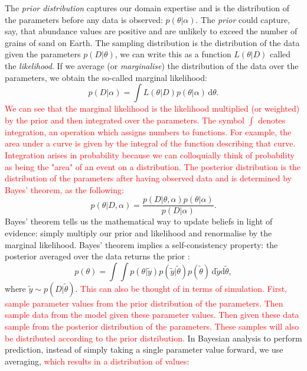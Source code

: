 \documentclass[12pt,english, journal=jpr, layout=twocolumn]{article}
\begin{document}
The \textit{prior distribution} captures our domain expertise and is the distribution of the parameters before any data is observed: $p(\theta|\alpha)$. The \textit{prior} could capture, say, that abundance values are positive and are unlikely to exceed the number of grains of sand on Earth. The sampling distribution is the distribution of the data given the parameters $p(D|\theta)$, we can write this as a function $L(\theta|D)$ called the \textit{likelihood}. If we average (or \textit{marginalise}) the distribution of the data over the parameters, we obtain the so-called marginal likelihood:
\begin{equation}
p(D|\alpha) = \int L(\theta|D)p(\theta|\alpha)\,\text{d}\theta.
\end{equation}
\textcolor{red}{We can see that the marginal likelihood is the likelihood multiplied (or weighted) by the prior and then integrated over the parameters. The symbol $\int$ denotes integration, an operation which assigns numbers to functions. For example, the area under a curve is given by the integral of the function describing that curve. Integration arises in probability because we can colloquially think of probability as being the "area" of an event on a distribution. The posterior distribution is the distribution of the parameters after having observed data and is determined by Bayes' theorem, as the following:}
\begin{equation}
p(\theta|D, \alpha) = \frac{p(D|\theta, \alpha)p(\theta|\alpha)}{p(D|\alpha)}.
\end{equation}
Bayes' theorem tells us the mathematical way to update beliefs in light of evidence: simply multiply our prior and likelihood and renormalise by the marginal likelihood. Bayes' theorem implies a self-consistency property: the posterior averaged over the data returns the prior \citep{Talts::2018}:
\begin{equation}
p(\theta) = \int \int p(\theta|\tilde{y})p(\tilde{y}|\tilde{\theta})p(\tilde{\theta})\,\text{d}\tilde{y}\text{d}\tilde{\theta},
\end{equation}
where $\tilde{y} \sim p(D|\tilde{\theta})$. \textcolor{red}{This can also be thought of in terms of simulation. First, sample parameter values from the prior distribution of the parameters. Then sample data from the model given these parameter values. Then given these data sample from the posterior distribution of the parameters. These samples will also be distributed according to the prior distribution.} In Bayesian analysis to perform prediction, instead of simply taking a single parameter value forward, we use averaging, \textcolor{red}{which results in a distribution of values}:
\end{document}
